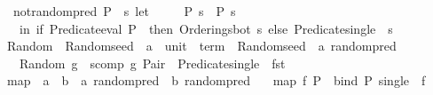 \begin{isabellebody}
\isanewline
\ \ {\isachardoublequoteopen}not{\isacharunderscore}{\kern0pt}randompred\ P\ {\isacharequal}{\kern0pt}\ {\isacharparenleft}{\kern0pt}{\isasymlambda}s{\isachardot}{\kern0pt}\ let\isanewline
\ \ \ \ \ {\isacharparenleft}{\kern0pt}P{\isacharprime}{\kern0pt}{\isacharcomma}{\kern0pt}\ s{\isacharprime}{\kern0pt}{\isacharparenright}{\kern0pt}\ {\isacharequal}{\kern0pt}\ P\ s\isanewline
\ \ \ in\ if\ Predicate{\isachardot}{\kern0pt}eval\ P{\isacharprime}{\kern0pt}\ {\isacharparenleft}{\kern0pt}{\isacharparenright}{\kern0pt}\ then\ {\isacharparenleft}{\kern0pt}Orderings{\isachardot}{\kern0pt}bot{\isacharcomma}{\kern0pt}\ s{\isacharprime}{\kern0pt}{\isacharparenright}{\kern0pt}\ else\ {\isacharparenleft}{\kern0pt}Predicate{\isachardot}{\kern0pt}single\ {\isacharparenleft}{\kern0pt}{\isacharparenright}{\kern0pt}{\isacharcomma}{\kern0pt}\ s{\isacharprime}{\kern0pt}{\isacharparenright}{\kern0pt}{\isacharparenright}{\kern0pt}{\isachardoublequoteclose}\isanewline
\isanewline
{}\isamarkupfalse%
\ Random\ {\isacharcolon}{\kern0pt}{\isacharcolon}{\kern0pt}\ {\isachardoublequoteopen}{\isacharparenleft}{\kern0pt}Random{\isachardot}{\kern0pt}seed\ {\isasymRightarrow}\ {\isacharparenleft}{\kern0pt}{\isacharprime}{\kern0pt}a\ {\isasymtimes}\ {\isacharparenleft}{\kern0pt}unit\ {\isasymRightarrow}\ term{\isacharparenright}{\kern0pt}{\isacharparenright}{\kern0pt}\ {\isasymtimes}\ Random{\isachardot}{\kern0pt}seed{\isacharparenright}{\kern0pt}\ {\isasymRightarrow}\ {\isacharprime}{\kern0pt}a\ random{\isacharunderscore}{\kern0pt}pred{\isachardoublequoteclose}\isanewline
\ \ \ {\isachardoublequoteopen}Random\ g\ {\isacharequal}{\kern0pt}\ scomp\ g\ {\isacharparenleft}{\kern0pt}Pair\ {\isasymcirc}\ {\isacharparenleft}{\kern0pt}Predicate{\isachardot}{\kern0pt}single\ {\isasymcirc}\ fst{\isacharparenright}{\kern0pt}{\isacharparenright}{\kern0pt}{\isachardoublequoteclose}\isanewline
\isanewline
{}\isamarkupfalse%
\ map\ {\isacharcolon}{\kern0pt}{\isacharcolon}{\kern0pt}\ {\isachardoublequoteopen}{\isacharparenleft}{\kern0pt}{\isacharprime}{\kern0pt}a\ {\isasymRightarrow}\ {\isacharprime}{\kern0pt}b{\isacharparenright}{\kern0pt}\ {\isasymRightarrow}\ {\isacharprime}{\kern0pt}a\ random{\isacharunderscore}{\kern0pt}pred\ {\isasymRightarrow}\ {\isacharprime}{\kern0pt}b\ random{\isacharunderscore}{\kern0pt}pred{\isachardoublequoteclose}\isanewline
\ \ \ {\isachardoublequoteopen}map\ f\ P\ {\isacharequal}{\kern0pt}\ bind\ P\ {\isacharparenleft}{\kern0pt}single\ {\isasymcirc}\ f{\isacharparenright}{\kern0pt}{\isachardoublequoteclose}\isanewline

\end{isabellebody}
